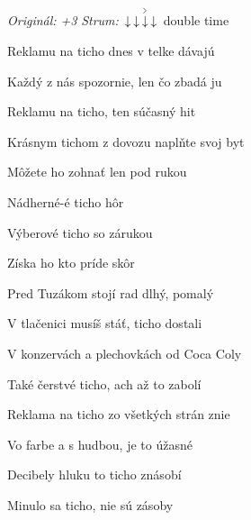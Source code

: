 \begin{song}


\begin{headerbox}
\RaiseBoxWithAccents
{} \quad
\textit{Originál: +3} \quad
\textit{Strum:} $\Down\Down\AccentDown\Down$ double time
\end{headerbox}

\begin{chordbox}
\end{chordbox}

\Large

\bigskip

Reklamu na ticho dnes v telke dávajú \par
{}Každý z nás spozornie, len čo zbadá ju \par
{}Reklamu na ticho, ten súčasný hit \par
{}Krásnym tichom z dovozu naplňte svoj byt \par

\bigskip

\begin{chorusbox}{\Refren}
Môžete ho zohnať len pod rukou \par
{}Nádherné-é ticho hôr \par
{}Výberové ticho  so zárukou \par
{}Získa ho kto príde skôr    \par
\end{chorusbox}

\bigskip

Pred Tuzákom stojí rad dlhý, pomalý \par
{}V tlačenici musíš stáť, ticho dostali \par
{}V konzervách a plechovkách od Coca Coly \par
{}Také čerstvé ticho, ach až to zabolí \par

\bigskip

\Refren

\bigskip

Reklama na ticho zo všetkých strán znie \par
{}Vo farbe a s hudbou, je to úžasné \par
{}Decibely hluku to ticho znásobí \par
{}Minulo sa ticho, nie sú zásoby \par


\end{song}
